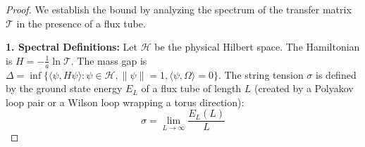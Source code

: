 \begin{proof}
We establish the bound by analyzing the spectrum of the transfer matrix $\mathcal{T}$ in the presence of a flux tube.

\textbf{1. Spectral Definitions:}
Let $\mathcal{H}$ be the physical Hilbert space. The Hamiltonian is $H = -\frac{1}{a} \ln \mathcal{T}$.
The mass gap is $\Delta = \inf \{ \langle \psi, H \psi \rangle : \psi \in \mathcal{H}, \|\psi\|=1, \langle \psi, \Omega \rangle = 0 \}$.
The string tension $\sigma$ is defined by the ground state energy $E_L$ of a flux tube of length $L$ (created by a Polyakov loop pair or a Wilson loop wrapping a torus direction):
\begin{equation}
\sigma = \lim_{L \to \infty} \frac{E_L(L)}{L}
\end{equation}


\end{proof}
